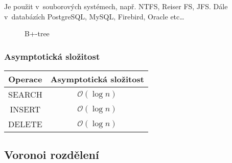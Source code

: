 Je použit v~souborových systémech, např. NTFS, Reiser FS, JFS. Dále
v~databázích PostgreSQL, MySQL, Firebird, Oracle etc\ldots{}

\begin{figure}[t]
\caption{B+-tree}
\end{figure}



\subsubsection{Asymptotická složitost}

\begin{tabular}{|c|c|}
\hline 
Operace & Asymptotická složitost\tabularnewline
\hline 
\hline 
SEARCH & $\mathcal{O}(\log n)$\tabularnewline
\hline 
INSERT & $\mathcal{O}(\log n)$\tabularnewline
\hline 
DELETE & $\mathcal{O}(\log n)$\tabularnewline
\hline 
\end{tabular}


\subsection{Voronoi rozdělení}